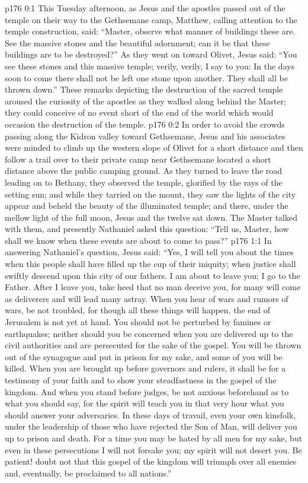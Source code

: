\author{Midwayer Commission}
\vs p176 0:1 This Tuesday afternoon, as Jesus and the apostles passed out of the temple on their way to the Gethsemane camp, Matthew, calling attention to the temple construction, said: “Master, observe what manner of buildings these are. See the massive stones and the beautiful adornment; can it be that these buildings are to be destroyed?” As they went on toward Olivet, Jesus said: \textcolor{ubdarkred}{“You see these stones and this massive temple; verily, verily, I say to you: In the days soon to come there shall not be left one stone upon another. They shall all be thrown down.”} These remarks depicting the destruction of the sacred temple aroused the curiosity of the apostles as they walked along behind the Master; they could conceive of no event short of the end of the world which would occasion the destruction of the temple.\plusone
\vs p176 0:2 In order to avoid the crowds passing along the Kidron valley toward Gethsemane, Jesus and his associates were minded to climb up the western slope of Olivet for a short distance and then follow a trail over to their private camp near Gethsemane located a short distance above the public camping ground. As they turned to leave the road leading on to Bethany, they observed the temple, glorified by the rays of the setting sun; and while they tarried on the mount, they saw the lights of the city appear and beheld the beauty of the illuminated temple; and there, under the mellow light of the full moon, Jesus and the twelve sat down. The Master talked with them, and presently Nathaniel asked this question: “Tell us, Master, how shall we know when these events are about to come to pass?”
\vs p176 1:1 In answering Nathaniel’s question, Jesus said: \textcolor{ubdarkred}{“Yes, I will tell you about the times when this people shall have filled up the cup of their iniquity; when justice shall swiftly descend upon this city of our fathers. I am about to leave you; I go to the Father. After I leave you, take heed that no man deceive you, for many will come as deliverers and will lead many astray. When you hear of wars and rumors of wars, be not troubled, for though all these things will happen, the end of Jerusalem is not yet at hand. You should not be perturbed by famines or earthquakes; neither should you be concerned when you are delivered up to the civil authorities and are persecuted for the sake of the gospel. You will be thrown out of the synagogue and put in prison for my sake, and some of you will be killed. When you are brought up before governors and rulers, it shall be for a testimony of your faith and to show your steadfastness in the gospel of the kingdom. And when you stand before judges, be not anxious beforehand as to what you should say, for the spirit will teach you in that very hour what you should answer your adversaries. In these days of travail, even your own kinsfolk, under the leadership of those who have rejected the Son of Man, will deliver you up to prison and death. For a time you may be hated by all men for my sake, but even in these persecutions I will not forsake you; my spirit will not desert you. Be patient! doubt not that this gospel of the kingdom will triumph over all enemies and, eventually, be proclaimed to all nations.”}
